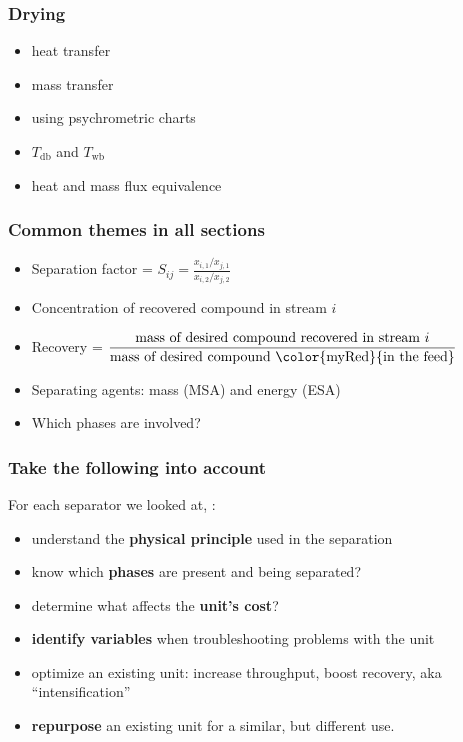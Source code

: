 {
\begin{frame}\frametitle{Drying {}}
	\begin{itemize}
		\item	heat transfer
		\item	mass transfer
		\item	using psychrometric charts
		\item	$T_\text{db}$ and $T_\text{wb}$
		\item	heat and mass flux equivalence
	\end{itemize}
\end{frame}}

\begin{frame}\frametitle{Common themes in all sections}
	\begin{itemize}
		\item	Separation factor = $S_{ij} = \displaystyle \frac{x_{i,1} / x_{j,1}}{x_{i,2} / x_{j,2}}$
		\item	Concentration of recovered compound in stream $i$
		\item	Recovery = $\displaystyle\frac{\text{mass of desired compound recovered in stream~} i}{\text{mass of desired compound {\color{myRed}{in the feed}}}}$
		\item	Separating agents: mass (MSA) and energy (ESA)
		\item	Which phases are involved?
	\end{itemize}
\end{frame}

\begin{frame}\frametitle{Take the following into account}
	For each separator we looked at, {\color{myOrange}{please aim to}}:
	\vspace{12pt}
	\begin{itemize}
		\item	understand the \textbf{physical principle} used in the separation
		\item	know which \textbf{phases} are present and being separated?
		\item	determine what affects the \textbf{unit's cost}?
		\item	\textbf{identify variables} when troubleshooting problems with the unit
		\item	optimize an existing unit: increase throughput, boost recovery, aka ``intensification''
		\item	\textbf{repurpose} an existing unit for a similar, but different use.
	\end{itemize}
\end{frame}

